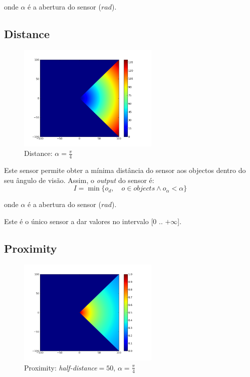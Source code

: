 \documentclass[a4paper]{article}
\begin{document}
onde $\alpha$ é a abertura do sensor ($rad$).


\cleardoublepage
\subsection{Distance}

\begin{figure}[h]
	\vspace{-20pt}
	\begin{center}
		\includegraphics[width=0.6\textwidth]{graphs/sensors/distance.png}
	\end{center}
	\vspace{-20pt}
	\caption{Distance: $\alpha=\frac{\pi}{4}$}
\end{figure}

\indent Este sensor permite obter a mínima distância do sensor aos objectos dentro do seu ângulo de visão.
Assim, o \emph{output} do sensor é:
\[
	I = \min\{o_{d},\quad o \in objects \land o_{\alpha} < \alpha\}
\] 

onde $\alpha$ é a abertura do sensor ($rad$).

Este é o único sensor a dar valores no intervalo [0 .. $+\infty$].

\cleardoublepage
\subsection{Proximity}
\begin{figure}[h]
	\vspace{-20pt}
	\begin{center}
		\includegraphics[width=0.6\textwidth]{graphs/sensors/proximity.png}
	\end{center}
	\vspace{-20pt}
	\caption{Proximity: \emph{half-distance}$=50$, $\alpha=\frac{\pi}{4}$}
\end{figure}
\end{document}
